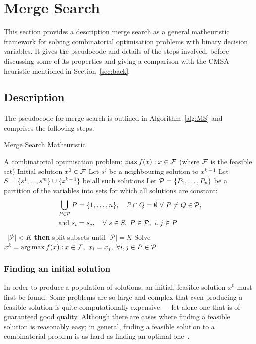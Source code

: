 \documentclass[journal]{IEEEtran}
\begin{document}
\section{Merge Search}\label{sec:merge}

This section provides a description merge search as a general matheuristic framework for solving combinatorial optimisation problems with binary decision variables. It gives the pseudocode and details of the steps involved, before discussing some of its properties and giving a comparison with the CMSA heuristic mentioned in Section~\ref{sec:back}.

\subsection{Description}
The pseudocode for merge search is outlined in Algorithm~\ref{alg:MS} and comprises the following steps.

\begin{algorithm}[htb!]
\caption{{\sf Merge Search Matheuristic}} \label{alg:MS}
\begin{algorithmic}[1]
  \Require A combinatorial optimisation problem: $\max f(x) : x\in {\cal F}$ (where ${\cal F}$ is the feasible set)
  \Require Initial solution $x^0\in \cal F$
    \State Let $s^j$ be a neighbouring solution to $x^{k-1}$
    \label{step:nbhd}
      \EndFor
    \State Let  $S=\{s^1,\ldots,s^m\}\cup\{x^{k-1}\}$ be all such solutions
    \State Let ${\cal P}=\{P_1,\ldots,P_p\}$ be a partition of the variables into sets for which all solutions are constant:\label{step:P}
    \begin{align*}
      \bigcup_{P\in {\cal P}} P&=\{1,\ldots,n\},\quad P \cap Q=\emptyset\ \forall\ P\ne Q\in  {\cal P},\\
      \text{ and } s_i &= s_j, \quad \forall\ s\in S,\ P\in {\cal P},\ i,j\in P
    \end{align*}
   \ {$|\mathcal{P}| < K$} {\bf then} split subsets until $|\mathcal{P}|=K$ \label{step:RandSplit}
  \State Solve $x^k=\text{arg}\max f(x) : x\in {\cal F},\ x_i=x_j,\ \forall
  i,j\in P\in{\cal P}$\label{step:merge}
\EndFor
\end{algorithmic}
\end{algorithm}

\subsubsection*{\bf Finding an initial solution}
In order to produce a population of solutions, an initial, feasible solution $x^0$ must first be found. Some problems are so large and complex that even producing a feasible solution is quite computationally expensive --- let alone one that is of guaranteed good quality. Although there are cases where finding a feasible solution is reasonably easy; in general, finding a feasible solution to a combinatorial problem is as hard as finding an optimal one~\cite{copalg}.
\end{document}
